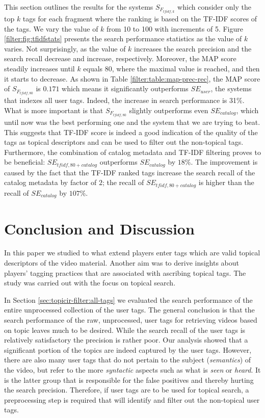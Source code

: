 This section outlines the results for the systems $S_{F_{tfidf,k}}$ which consider only the top $k$ tags for each fragment where the ranking is based on the TF-IDF scores of the tags. We vary the value of $k$ from 10 to 100 with increments of 5. Figure \ref{filter:fig:tfidfstats} presents the search performance statistics as the value of $k$ varies. Not surprisingly, as the value of $k$ increases the search precision and the search recall decrease and increase, respectively. Moreover, the MAP score steadily increases until $k$ equals 80, where the maximal value is reached, and then it starts to decrease. As shown in Table \ref{filter:table:map-prec-rec}, the MAP score of $S_{F_{tfidf,80}}$ is $0.171$ which means it significantly outperforms $SE_{user}$, the systems that indexes all user tags. Indeed, the increase in search performance is 31\%. What is more important is that $S_{F_{tfidf,80}}$ slightly outperforms even $SE_{catalog}$, which until now was the best performing one and the system that we are trying to beat. This suggests that TF-IDF score is indeed a good indication of the quality of the tags as topical descriptors and can be used to filter out the non-topical tags. Furthermore, the combination of catalog metadata and TF-IDF filtering proves to be beneficial: $SE_{tfidf,80 + catalog}$ outperforms  $SE_{catalog}$ by $18\%$. The improvement is caused by the fact that the TF-IDF ranked tags increase the search recall of the catalog metadata by factor of $2$; the recall of $SE_{tfidf,80 + catalog}$ is higher than the recall of $SE_{catalog}$ by $107\%$.

\section{Conclusion and Discussion}\label{sec:topicir-filter:con}
In this paper we studied to what extend players enter tags which are valid topical descriptors of the video material. Another aim was to derive insights about players’ tagging practices that are associated with ascribing topical tags. The study was carried out with the focus on topical search.

In Section \ref{sec:topicir-filter:all-tags} we evaluated the search performance of the entire unprocessed collection of the user tags. The general conclusion is that the search performance of the raw, unprocessed, user tags for retrieving videos based on topic leaves much to be desired. While the search recall of the user tags is relatively satisfactory the precision is rather poor. Our analysis showed that a significant portion of the topics are indeed captured by the user tags. However, there are also many user tags that do not pertain to the subject (\textit{semantics}) of the video, but refer to the more \textit{syntactic} aspects such as what is \textit{seen} or \textit{heard}. It is the latter group that is responsible for the false positives and thereby hurting the search precision. Therefore, if user tags are to be used for topical search, a preprocessing step is required that will identify and filter out the non-topical user tags.

